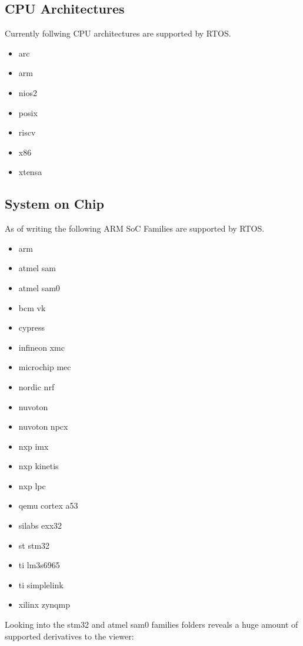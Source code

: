 \subsection{CPU Architectures}

Currently follwing CPU architectures are supported by \Zephyr RTOS. 
\begin{multicols}{4}
\begin{itemize}
\item arc
\item arm
\item nios2
\item posix
\item riscv
\item x86
\item xtensa
\end{itemize}
\end{multicols}


\subsection{System on Chip}
As of writing the  following ARM SoC Families are supported by \Zephyr RTOS.

\begin{multicols}{4}
\begin{itemize}
\item arm
\item atmel sam
\item atmel sam0
\item bcm vk
\item cypress
\item infineon xmc
\item microchip mec
\item nordic nrf
\item nuvoton
\item nuvoton npcx
\item nxp imx
\item nxp kinetis
\item nxp lpc
\item qemu cortex a53
\item silabs exx32
\item st stm32
\item ti lm3s6965
\item ti simplelink
\item xilinx zynqmp
\end{itemize}
\end{multicols}


Looking into the stm32 and atmel sam0 families folders reveals a huge amount of supported derivatives to the viewer:

